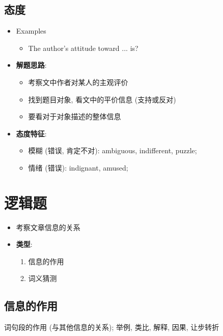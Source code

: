   \subsection{态度}

    \begin{itemize}
      \item Examples
      \begin{itemize}
        \item The author's attitude toward ... is?
      \end{itemize}

      \item \textbf{解题思路}:
      \begin{itemize}
        \item 考察文中作者对某人的主观评价
        \item 找到题目对象, 看文中的平价信息 (支持或反对)
        \item 要看对于对象描述的整体信息
      \end{itemize}

      \item \textbf{态度特征}:
      \begin{itemize}
        \item 模糊 (错误, 肯定不对): ambiguous, indifferent, puzzle;
        \item 情绪 (错误): indignant, amused;
      \end{itemize}
    \end{itemize}

\section{逻辑题}

  \begin{itemize}
    \item 考察文章信息的关系
    \item \textbf{类型}:
    \begin{enumerate}
      \item 信息的作用
      \item 词义猜测
    \end{enumerate}
  \end{itemize}

  \subsection{信息的作用}

    词句段的作用 (与其他信息的关系); 举例, 类比, 解释, 因果, 让步转折

